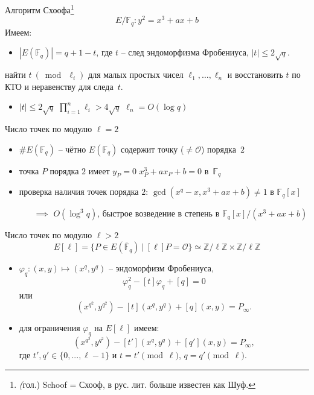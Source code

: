 \documentclass{beamer}
\begin{document}
\begin{frame}{Алгоритм Схоофа\footnote{\textit(гол.) Schoof = Схооф, в рус. лит. больше известен как Шуф.}}
\[
E/\mathbb{F}_q: y^2 = x^3 + a x + b
\]
Имеем:
\begin{itemize}
    \item $|E(\mathbb{F}_q)| = q + 1 - t$, где $t$ -- след эндоморфизма Фробениуса, $|t| \leq 2 \sqrt{q}$.
\end{itemize}

\vspace{1em}
 найти $t~(\bmod~\ell_i)$ для малых простых чисел $\ell_1, \ldots, \ell_n$ и восстановить $t$ по КТО и неравенству для следа~$t$.

\begin{itemize}
    \item $|t| \leq 2 \sqrt{q}$ \structure{$\implies$} $\prod_{i=1}^{n} \ell_i > 4 \sqrt{q}$ \structure{$\implies$} $\ell_n = O(\log{q})$
\end{itemize}
\end{frame}

\begin{frame}{Число точек по модулю $\ell = 2$}
    \begin{itemize}
        \item $\#E(\mathbb{F}_q)$ -- чётно \structure{$\iff$} $E(\mathbb{F}_q)$ содержит точку ($\neq \mathcal{O}$) порядка~$2$
        \vspace{0.5em}
        \item точка $P$ порядка $2$ имеет $y_P=0$ \structure{$\iff$} $x_P^3 + a x_P + b = 0$ в~$\mathbb{F}_q$
        \vspace{0.5em}
        \item проверка наличия точек порядка $2$: $\gcd(x^q - x, x^3 + a x + b) \neq 1$ в $\mathbb{F}_q[x]$
        \begin{itemize}
            \item[$\implies$] $O(\log^3{q})$, быстрое возведение в степень в $\mathbb{F}_q[x]/(x^3 + a x + b)$
         \end{itemize}
    \end{itemize}
\end{frame}

\begin{frame}{Число точек по модулю $\ell > 2$}
\[
E[\ell] = \{P \in E(\overline{\mathbb{F}}_q)~|~[\ell] P = \mathcal{O}\} \simeq \mathbb{Z}/\ell\mathbb{Z} \times \mathbb{Z}/\ell \mathbb{Z}
\]
\begin{itemize}
    \item $\varphi_q: (x, y) \mapsto (x^q, y^q)$ -- эндоморфизм Фробениуса,
    \[
    \varphi_q^2 - [t] \varphi_q + [q] = 0
    \]
    или
    \[
    (x^{q^2}, y^{q^2}) - [t] (x^{q}, y^{q}) + [q](x,y) = P_\infty.
    \]
    \item для ограничения $\varphi_q$ на $E[\ell]$ имеем:
    \[
    (x^{q^2}, y^{q^2}) - [t'] (x^{q}, y^{q}) + [q'](x,y) = P_\infty,
    \]
    где $t', q' \in \{0, ..., \ell-1\}$ и $t = t' \pmod{\ell}$, $q = q' \pmod{\ell}$.
\end{itemize}
\end{frame}
\end{document}

